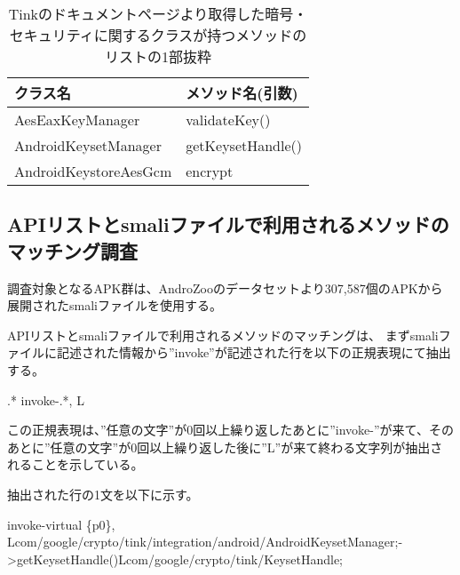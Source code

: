 \begin{table}[t]
\begin{center}
\caption{Tinkのドキュメントページより取得した暗号・セキュリティに関するクラスが持つメソッドのリストの1部抜粋}
\begin{tabular}{ll} \hline
クラス名 & メソッド名(引数) \\ \hline
AesEaxKeyManager & validateKey() \\
AndroidKeysetManager & getKeysetHandle() \\
AndroidKeystoreAesGcm &  encrypt\\ \hline
\end{tabular}
\label{tb:APImethod}
\end{center}
\end{table}

\newpage

\subsection{APIリストとsmaliファイルで利用されるメソッドのマッチング調査}
\label{sec:調査}
調査対象となるAPK群は、AndroZoo\cite{AndroZoo}のデータセットより307,587個のAPKから展開されたsmaliファイルを使用する。

APIリストとsmaliファイルで利用されるメソッドのマッチングは、
まずsmaliファイルに記述された情報から”invoke”が記述された行を以下の正規表現にて抽出する。

\begin{center} .* invoke-.*, L \end{center}

この正規表現は、”任意の文字”が0回以上繰り返したあとに”invoke-”が来て、そのあとに”任意の文字”が0回以上繰り返した後に”L”が来て終わる文字列が抽出されることを示している。

抽出された行の1文を以下に示す。

\begin{center} invoke-virtual \{p0\}, Lcom/google/crypto/tink/integration/android/AndroidKeysetManager;-\textgreater getKeysetHandle()Lcom/google/crypto/tink/KeysetHandle;\end{center}　

